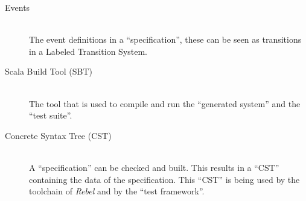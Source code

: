 \begin{description}
\item[Events]\hfill\\
The event definitions in a ``specification'', these can be seen as transitions
in a Labeled Transition System.

\item[Scala Build Tool (SBT)]\hfill\\
The tool that is used to compile and run the ``generated system'' and the
``test suite''.

\item[Concrete Syntax Tree (CST)]\hfill\\
A ``specification'' can be checked and built. This results in a ``CST''
containing the data of the specification. This ``CST'' is being used by the
toolchain of \textit{Rebel} and by the ``test framework''.

\end{description}
